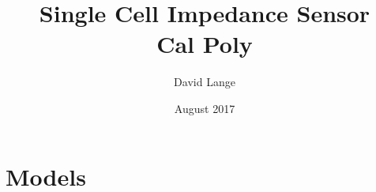 \documentclass[12pt]{report}
\title{
        {Single Cell Impedance Sensor}\\
        {\large Cal Poly}
}
\author{David Lange}
\date{August 2017}
\begin{document}


%

%

%

\tableofcontents

\listoffigures

\listoftables

\doublespacing

%
\newpage
{}





%

%

%

\chapter{Models}


% 

%

\singlespacing
\printbibliography
\end{document}
